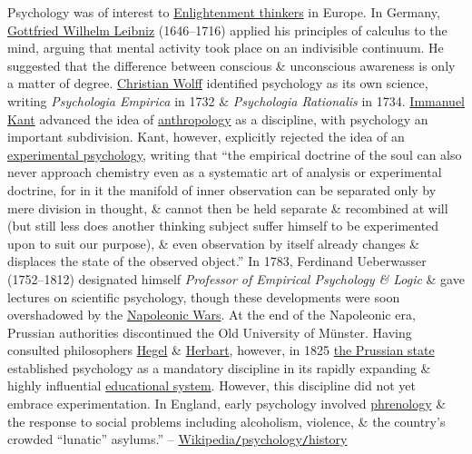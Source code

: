 \documentclass[oneside]{book}
\numberwithin{equation}{section}
\begin{document}
Psychology was of interest to \href{https://en.wikipedia.org/wiki/Age_of_Enlightenment}{Enlightenment thinkers} in Europe. In Germany, \href{https://en.wikipedia.org/wiki/Gottfried_Wilhelm_Leibniz}{Gottfried Wilhelm Leibniz} (1646--1716) applied his principles of calculus to the mind, arguing that mental activity took place on an indivisible continuum. He suggested that the difference between conscious \& unconscious awareness is only a matter of degree. \href{https://en.wikipedia.org/wiki/Christian_Wolff_(philosopher)}{Christian Wolff} identified psychology as its own science, writing \textit{Psychologia Empirica} in 1732 \& \textit{Psychologia Rationalis} in 1734. \href{https://en.wikipedia.org/wiki/Immanuel_Kant}{Immanuel Kant} advanced the idea of \href{https://en.wikipedia.org/wiki/Anthropology}{anthropology} as a discipline, with psychology an important subdivision. Kant, however, explicitly rejected the idea of an \href{https://en.wikipedia.org/wiki/Experimental_psychology}{experimental psychology}, writing that ``the empirical doctrine of the soul can also never approach chemistry even as a systematic art of analysis or experimental doctrine, for in it the manifold of inner observation can be separated only by mere division in thought, \& cannot then be held separate \& recombined at will (but still less does another thinking subject suffer himself to be experimented upon to suit our purpose), \& even observation by itself already changes \& displaces the state of the observed object.'' In 1783, Ferdinand Ueberwasser (1752--1812) designated himself \textit{Professor of Empirical Psychology \& Logic} \& gave lectures on scientific psychology, though these developments were soon overshadowed by the \href{https://en.wikipedia.org/wiki/Napoleonic_Wars}{Napoleonic Wars}. At the end of the Napoleonic era, Prussian authorities discontinued the Old University of M\"unster. Having consulted philosophers \href{https://en.wikipedia.org/wiki/Georg_Friedrich_Wilhelm_Hegel}{Hegel} \& \href{https://en.wikipedia.org/wiki/Johann_Friedrich_Herbart}{Herbart}, however, in 1825 \href{https://en.wikipedia.org/wiki/Prussia}{the Prussian state} established psychology as a mandatory discipline in its rapidly expanding \& highly influential \href{https://en.wikipedia.org/wiki/Prussian_education_system}{educational system}. However, this discipline did not yet embrace experimentation. In England, early psychology involved \href{https://en.wikipedia.org/wiki/Phrenology}{phrenology} \& the response to social problems including alcoholism, violence, \& the country's crowded ``lunatic'' asylums.'' -- \href{https://en.wikipedia.org/wiki/Psychology#History}{Wikipedia\texttt{/}psychology\texttt{/}history}
\end{document}
